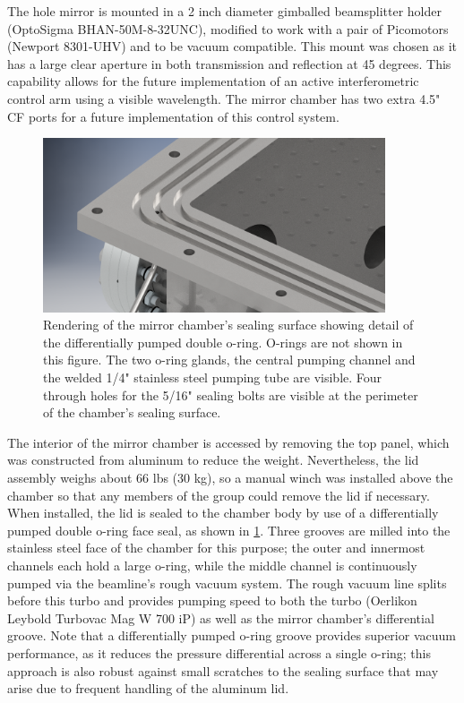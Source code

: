 The hole mirror is mounted in a 2 inch diameter gimballed beamsplitter holder (OptoSigma BHAN-50M-8-32UNC), modified to work with a pair of Picomotors (Newport 8301-UHV) and to be vacuum compatible. This mount was chosen as it has a large clear aperture in both transmission and reflection at 45 degrees. This capability allows for the future implementation of an active interferometric control arm using a visible wavelength. The mirror chamber has two extra 4.5" CF ports for a future implementation of this control system.

\begin{figure}
	\centering
	\includegraphics[width=0.9\textwidth]{figures/chap2/mirror_chamber-diff_pump_groove.png}
	\caption{Rendering of the mirror chamber's sealing surface showing detail of the differentially pumped double o-ring. O-rings are not shown in this figure. The two o-ring glands, the central pumping channel and the welded 1/4" stainless steel pumping tube are visible. Four through holes for the 5/16" sealing bolts are visible at the perimeter of the chamber's sealing surface.}
	\label{fig:mirror_chamber_diff_pump_groove}
\end{figure}

The interior of the mirror chamber is accessed by removing the top panel, which was constructed from aluminum to reduce the weight. Nevertheless, the lid assembly weighs about 66 lbs (30 kg), so a manual winch was installed above the chamber so that any members of the group could remove the lid if necessary. When installed, the lid is sealed to the chamber body by use of a differentially pumped double o-ring face seal, as shown in \cref{fig:mirror_chamber_diff_pump_groove}. Three grooves are milled into the stainless steel face of the chamber for this purpose; the outer and innermost channels each hold a large o-ring, while the middle channel is continuously pumped via the beamline's rough vacuum system. The rough vacuum line splits before this turbo and provides pumping speed to both the turbo (Oerlikon Leybold Turbovac Mag W 700 iP) as well as the mirror chamber's differential groove. Note that a differentially pumped o-ring groove provides superior vacuum performance, as it reduces the pressure differential across a single o-ring; this approach is also robust against small scratches to the sealing surface that may arise due to frequent handling of the aluminum lid.

